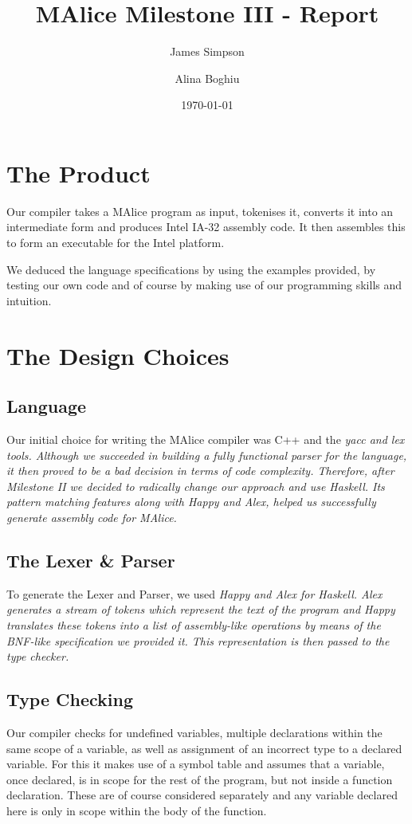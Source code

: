 \documentclass[11pt]{article}
\title{MAlice Milestone III - Report}
\author{James Simpson \and Alina Boghiu}
\date{\today}
\begin{document}
\maketitle

\section{The Product}
Our compiler takes a MAlice program as input, tokenises it, converts it into an intermediate form and produces Intel IA-32 assembly code. It then assembles this to form an executable for the Intel platform.

We deduced the language specifications by using the examples provided, by testing our own code and of course by making use of our programming skills and intuition.

\section{The Design Choices}

\subsection{Language}
Our initial choice for writing the MAlice compiler was C++ and the \sl yacc \rm and \sl lex \rm tools. Although we succeeded in building a fully functional parser for the language, it then proved to be a bad decision in terms of code complexity. Therefore, after Milestone II we decided to radically change our approach and use Haskell. Its pattern matching features along with Happy and Alex, helped us successfully generate assembly code for MAlice.

\subsection{The Lexer \& Parser}
To generate the Lexer and Parser, we used \sl Happy \rm and \sl Alex \rm for Haskell. Alex generates a stream of tokens which represent the text of the program and Happy translates these tokens into a list of assembly-like operations by means of the BNF-like specification we provided it. This representation is then passed to the type checker.

\subsection{Type Checking}
Our compiler checks for undefined variables, multiple declarations within the same scope of a variable, as well as assignment of an incorrect type to a declared variable. For this it makes use of a symbol table and assumes that a variable, once declared, is in scope for the rest of the program, but not inside a function declaration. These are of course considered separately and any variable declared here is only in scope within the body of the function.
\end{document}

